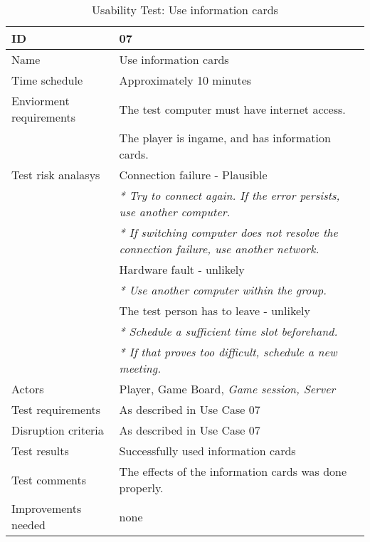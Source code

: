 {\footnotesize
\begin{table}[H]
\begin{tabular}{| p{5cm} | p{10cm} |}\hline
	\textbf{ID}	& \textbf{07} \\ \hline
	Name		& Use information cards\\ \hline
	Time schedule	& Approximately 10 minutes\\ \hline
	Enviorment requirements 
		& The test computer must have internet access. \\ 
		& The player is ingame, and has information cards.\\ \hline
	Test risk analasys 
		& Connection failure - Plausible \\
		& \emph{* Try to connect again. If the error persists, use another computer.} \\
		& \emph{* If switching computer does not resolve the connection failure, use another network.}\\
		& Hardware fault - unlikely \\
		& \emph{* Use another computer within the group.} \\
		& The test person has to leave - unlikely \\
		& \emph{* Schedule a sufficient time slot beforehand.} \\
		& \emph{* If that proves too difficult, schedule a new meeting.}\\ \hline
	Actors	& Player, Game Board, \emph{Game session, Server}\\ \hline
	Test requirements & As described in Use Case 07 \\ \hline
	Disruption criteria & As described in Use Case 07  \\ \hline
	Test results & Successfully used information cards
		& \\ \hline
	Test comments & The effects of the information cards was done properly. 
		& \\ \hline
	Improvements needed & none
		& \\ \hline
\end{tabular}


\caption{Usability Test: Use information cards}
\label{fig:usability_test_7}
\end{table}}


